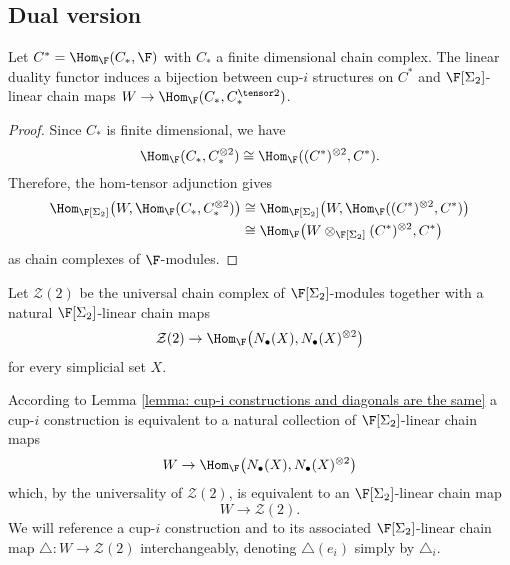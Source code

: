 \subsection{Dual version}

\begin{lemma} \label{lemma: cup-i constructions and diagonals are the same}
	Let $C^* = \Hom_{\F}(C_*, \F)$ with $C_*$ a finite dimensional chain complex. The linear duality functor induces a bijection between cup-$i$ structures on $C^*$ and $\F[\Sigma_2]$-linear chain maps $W \to \Hom_{\F}(C_*, C_*^{\tensor 2})$.
\end{lemma}

\begin{proof}
    Since $C_\ast$ is finite dimensional, we have
    \[
    \Hom_{\F}(C_\ast, C_\ast^{\otimes 2}) \cong \Hom_{\F}((C^\ast)^{\otimes 2}, C^\ast).
    \]
    Therefore, the hom-tensor adjunction gives
    \begin{align*}
    \Hom_{\F[\Sigma_2]}\big(W, \Hom_{\F}(C_\ast, C_\ast^{\otimes 2}) \big) & \cong
    \Hom_{\F[\Sigma_2]}\big(W, \Hom_{\F}((C^\ast)^{\otimes 2}, C^\ast) \big) \\ & \cong
    \Hom_{\F} \big(W \otimes_{\F[\Sigma_2]} (C^\ast)^{\otimes 2}, C^\ast \big)
    \end{align*}
    as chain complexes of $\F$-modules.
\end{proof}

\begin{definition}
	Let $\mathcal Z(2)$ be the universal chain complex of $\F[\Sigma_2]$-modules together with a natural $\F[\Sigma_2]$-linear chain maps
	\[
	\mathcal Z(2) \to \Hom_{\F}\big( N_\bullet(X), N_\bullet(X)^{\otimes 2} \big)
	\]
	for every simplicial set $X$.
\end{definition}

According to Lemma \ref{lemma: cup-i constructions and diagonals are the same} a cup-$i$ construction is equivalent to a natural collection of $\F[\Sigma_2]$-linear chain maps
\[
W \to \Hom_{\F}\big( N_\bullet(X), N_\bullet(X)^{\otimes 2} \big)
\]
which, by the universality of $\mathcal Z(2)$, is equivalent to an $\F[\Sigma_2]$-linear chain map
\[
W \to \mathcal Z(2).
\]
We will reference a cup-$i$ construction and to its associated $\F[\Sigma_2]$-linear chain map $\triangle \colon W \to \mathcal Z(2)$ interchangeably, denoting $\triangle(e_i)$ simply by $\triangle_i$.

